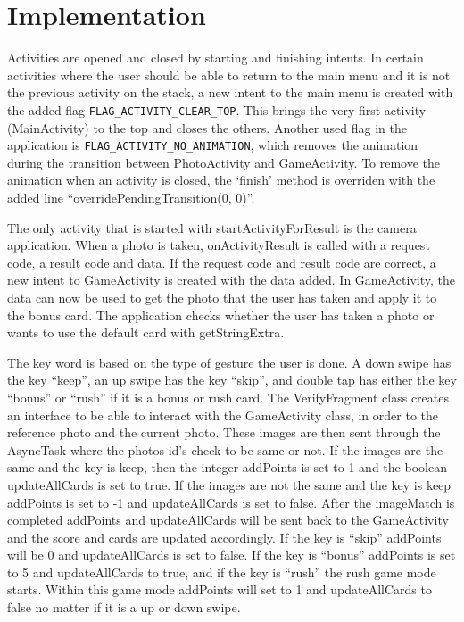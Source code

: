 \section{Implementation}
Activities are opened and closed by starting and finishing intents. In certain activities where the user should be able to return to the main menu and it is not the previous activity on the stack, a new intent to the main menu is created with the added flag \verb|FLAG_ACTIVITY_CLEAR_TOP|. This brings the very first activity (MainActivity) to the top and closes the others. Another used flag in the application is \verb|FLAG_ACTIVITY_NO_ANIMATION|, which removes the animation during the transition between PhotoActivity and GameActivity. To remove the animation when an activity is closed, the ‘finish’ method is overriden with the added line “overridePendingTransition(0, 0)”. \newline

The only activity that is started with startActivityForResult is the camera application. When a photo is taken, onActivityResult is called with a request code, a result code and data. If the request code and result code are correct, a new intent to GameActivity is created with the data added. In GameActivity, the data can now be used to get the photo that the user has taken and apply it to the bonus card. The application checks whether the user has taken a photo or wants to use the default card with getStringExtra. \newline

The key word is based on the type of gesture the user is done. A down swipe has the key “keep”, an up swipe has the key “skip”, and double tap has either the key “bonus” or “rush” if it is a bonus or rush card.  The VerifyFragment class creates an interface to be able to interact with the GameActivity class, in order to the reference photo and the current photo. These images are then sent through the AsyncTask where the photos id’s check to be same or not.  If the images are the same and the key is keep, then the integer addPoints is set to 1 and the boolean updateAllCards is set to true. If the images are not the same and the key is keep addPoints is set to -1 and updateAllCards is set to false. After the imageMatch is completed addPoints and updateAllCards will be sent back to the GameActivity and the score and cards are updated accordingly. If the key is “skip” addPoints will be 0 and updateAllCards is set to false. If the key is “bonus” addPoints is set to 5 and updateAllCards to true, and if the key is “rush” the rush game mode starts. Within this game mode addPoints will set to 1 and updateAllCards to false no matter if it is a up or down swipe. \newline

